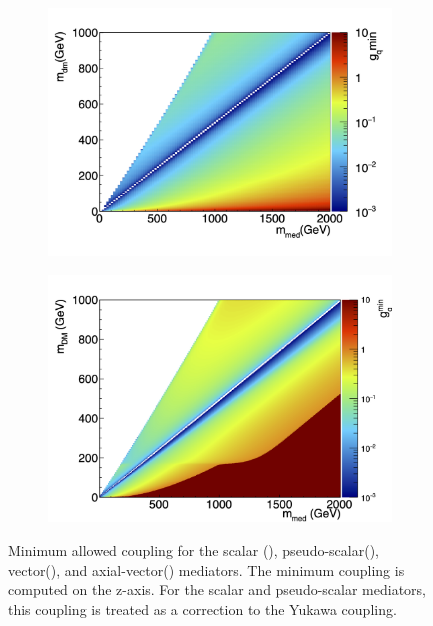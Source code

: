 \documentclass[a4paper, 11pt]{article}
\begin{document}
\begin{figure}[htp!]
\begin{center}
\begin{subfigure}[b]{0.49\textwidth}
    \includegraphics[width=\textwidth]{figures/coupling/v_gqmin.png}
    \caption{}
    \label{subfig:vector}
  \end{subfigure}
  \begin{subfigure}[b]{0.49\textwidth}  
    \includegraphics[width=\textwidth]{figures/coupling/a_gqmin.png}
    \caption{}
    \label{subfig:axialvector}  
  \end{subfigure}
  \caption{
    Minimum allowed coupling for the scalar (), pseudo-scalar(), vector(), and axial-vector() mediators. The minimum coupling is computed on the z-axis. For the scalar and pseudo-scalar mediators, this coupling is treated as a correction to the Yukawa coupling.  
  }
  \label{fig:mincoupling}
  \end{center}
\end{figure}
\end{document}

